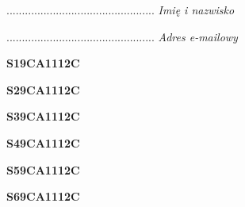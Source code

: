 \begin{turn}{90}\begin{minipage}{\linewidth} \vspace{20mm} ................................................  \textit{Imię i nazwisko}\end{minipage}\end{turn}

\begin{turn}{90}\begin{minipage}{\linewidth} \vspace{20mm} ................................................  \textit{Adres e-mailowy}\end{minipage}\end{turn}

\begin{turn}{90}\huge \begin{minipage}{\linewidth} \vspace{10mm}\textbf{S19CA1112C}\end{minipage}\end{turn}

\begin{turn}{90}\huge \begin{minipage}{\linewidth} \vspace{10mm}\textbf{S29CA1112C}\end{minipage}\end{turn}

\begin{turn}{90}\huge \begin{minipage}{\linewidth} \vspace{10mm}\textbf{S39CA1112C}\end{minipage}\end{turn}

\begin{turn}{90}\huge \begin{minipage}{\linewidth} \vspace{10mm}\textbf{S49CA1112C}\end{minipage}\end{turn}

\begin{turn}{90}\huge \begin{minipage}{\linewidth} \vspace{10mm}\textbf{S59CA1112C}\end{minipage}\end{turn}

\begin{turn}{90}\huge \begin{minipage}{\linewidth} \vspace{10mm}\textbf{S69CA1112C}\end{minipage}\end{turn}

